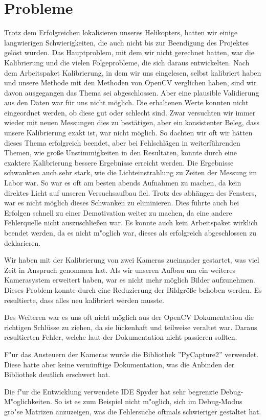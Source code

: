 \chapter{Probleme}
\label{cha:probleme}

Trotz dem Erfolgreichen lokalisieren unseres Helikopters, hatten wir einige langwierigen Schwierigkeiten, die auch nicht bis zur Beendigung des Projektes gelöst wurden. Das Hauptproblem, mit dem wir nicht gerechnet hatten, war die Kalibrierung und die vielen Folgeprobleme, die sich daraus entwickelten. Nach dem Arbeitspaket Kalibrierung, in dem wir uns eingelesen, selbst kalibriert haben und unsere Methode mit den Methoden von OpenCV verglichen haben, sind wir davon ausgegangen das Thema sei abgeschlossen. Aber eine plausible Validierung aus den Daten war für uns nicht möglich. Die erhaltenen Werte konnten nicht eingeordnet werden, ob diese gut oder schlecht sind. Zwar versuchten wir immer wieder mit neuen Messungen dies zu bestätigen, aber ein konsistenter Beleg, dass unsere Kalibrierung exakt ist, war nicht möglich. So dachten wir oft wir hätten dieses Thema erfolgreich beendet, aber bei Fehlschlägen in weiterführenden Themen, wie große Unstimmigkeiten in den Resultaten, konnte durch eine exaktere Kalibrierung bessere Ergebnisse erreicht werden. Die Ergebnisse schwankten auch sehr stark, wie die Lichteinstrahlung zu Zeiten der Messung im Labor war. So war es oft am besten abends Aufnahmen zu machen, da kein direktes Licht auf unseren Versuchsaufbau fiel. Trotz des abhängen des Fensters, war es nicht möglich dieses Schwanken zu eliminieren. Dies führte auch bei Erfolgen schnell zu einer Demotivation weiter zu machen, da eine andere Fehlerquelle nicht auszuschließen war. Es konnte auch kein Arbeitspaket wirklich beendet werden, da es nicht m"oglich war, dieses als erfolgreich abgeschlossen zu deklarieren.

\noindent Wir haben mit der Kalibrierung von zwei Kameras zueinander gestartet, was viel Zeit in Anspruch genommen hat. Als wir unseren Aufbau um ein weiteres Kamerasystem erweitert haben, war es nicht mehr möglich Bilder aufzunehmen. Dieses Problem konnte durch eine Reduzierung der Bildgröße behoben werden. Es resultierte, dass alles neu kalibriert werden musste.\newline

\noindent Des Weiteren war es uns oft nicht möglich aus der OpenCV Dokumentation die richtigen Schlüsse zu ziehen, da sie lückenhaft und teilweise veraltet war. Daraus resultierten Fehler, welche laut der Dokumentation nicht passieren sollten.\newline

\noindent F"ur das Ansteuern der Kameras wurde die Bibliothek ''PyCapture2'' verwendet. Diese hatte aber keine vernünftige Dokumentation, was die Anbinden der Bibliothek deutlich erschwert hat.

\noindent Die f"ur die Entwicklung verwendete IDE Spyder hat sehr begrenzte Debug-M"oglichkeiten. So ist es zum Beispiel nicht m"oglich, sich im Debug-Modus gro"se Matrizen anzuzeigen, was die Fehlersuche oftmals schwieriger gestaltet hat.

